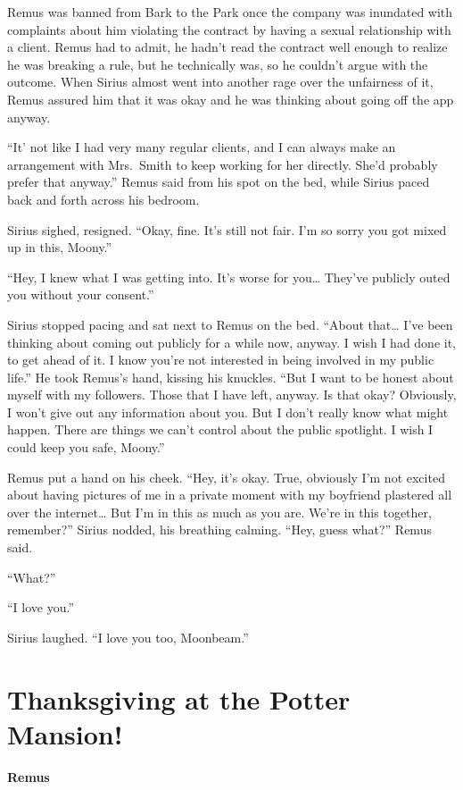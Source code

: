 \documentclass[12pt,twoside,openright]{memoir}
\begin{document}
Remus was banned from Bark to the Park once the company was inundated with complaints about him violating the contract by having a sexual relationship with a client. Remus had to admit, he hadn't read the contract well enough to realize he was breaking a rule, but he technically was, so he couldn't argue with the outcome. When Sirius almost went into another rage over the unfairness of it, Remus assured him that it was okay and he was thinking about going off the app anyway. 

``It' not like I had very many regular clients, and I can always make an arrangement with Mrs.\ Smith to keep working for her directly. She'd probably prefer that anyway.'' Remus said from his spot on the bed, while Sirius paced back and forth across his bedroom.

Sirius sighed, resigned. ``Okay, fine. It's still not fair. I'm so sorry you got mixed up in this, Moony.''

``Hey, I knew what I was getting into. It's worse for you… They've publicly outed you without your consent.''

Sirius stopped pacing and sat next to Remus on the bed. ``About that… I've been thinking about coming out publicly for a while now, anyway. I wish I had done it, to get ahead of it. I know you're not interested in being involved in my public life.'' He took Remus's hand, kissing his knuckles. ``But I want to be honest about myself with my followers. Those that I have left, anyway. Is that okay? Obviously, I won't give out any information about you. But I don't really know what might happen. There are things we can't control about the public spotlight. I wish I could keep you safe, Moony.''

Remus put a hand on his cheek. ``Hey, it's okay. True, obviously I'm not excited about having pictures of me in a private moment with my boyfriend plastered all over the internet… But I'm in this as much as you are. We're in this together, remember?'' Sirius nodded, his breathing calming. ``Hey, guess what?'' Remus said.

``What?''

``I love you.'' 

Sirius laughed. ``I love you too, Moonbeam.''

\chapter{Thanksgiving at the Potter Mansion!}

\textbf{Remus} 
\end{document}
